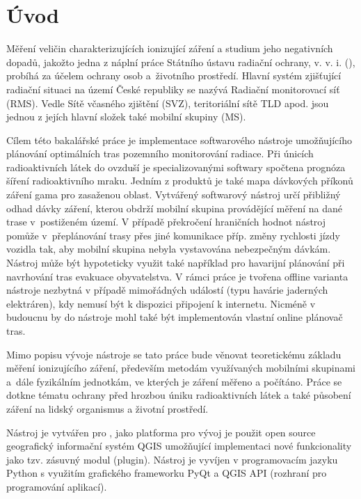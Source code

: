 \chapter{Úvod}
\label{1-uvod}
Měření veličin charakterizujících ionizující záření a studium jeho negativních dopadů, jakožto jedna z náplní práce Státního ústavu radiační ochrany, v. v. i. (), probíhá za účelem ochrany osob a~životního prostředí. %
Hlavní systém zjišťující radiační situaci na území České republiky se nazývá Radiační monitorovací síť (RMS). Vedle Sítě včasného zjištění (SVZ), teritoriální sítě TLD apod. jsou jednou z jejích hlavní složek také mobilní skupiny (MS).

Cílem této bakalářské práce je implementace softwarového nástroje umožňujícího plánování optimálních tras pozemního monitorování radiace. Při únicích radioaktivních látek do ovzduší je specializovanými softwary spočtena prognóza šíření radioaktivního mraku. Jedním z produktů je také mapa dávkových příkonů záření gama pro zasaženou oblast. Vytvářený softwarový nástroj určí přibližný odhad dávky záření, kterou obdrží mobilní skupina provádějící měření na dané trase v~postiženém území. V případě překročení hraničních hodnot nástroj pomůže v~přeplánování trasy přes jiné komunikace příp. změny rychlosti jízdy vozidla tak, aby mobilní skupina nebyla vystavována nebezpečným dávkám. 
Nástroj může být hypoteticky využit také například pro havarijní plánování při navrhování tras evakuace obyvatelstva. V rámci práce je tvořena offline varianta nástroje nezbytná v případě mimořádných událostí (typu havárie jaderných elektráren), kdy nemusí být k dispozici připojení k internetu. Nicméně v budoucnu by do nástroje mohl také být implementován vlastní online plánovač tras. 

Mimo popisu vývoje nástroje se tato práce bude věnovat teoretickému základu měření ionizujícího záření, především metodám využívaných mobilními skupinami a~dále fyzikálním jednotkám, ve kterých je záření měřeno a počítáno. Práce se  dotkne tématu ochrany před hrozbou úniku radioaktivních látek a také působení záření na lidský organismus a životní prostředí.

Nástroj je vytvářen pro , jako platforma pro vývoj je použit open source geografický informační systém QGIS umožňující implementaci nové funkcionality jako tzv. zásuvný modul (plugin). Nástroj je vyvíjen v programovacím jazyku Python s využitím grafického frameworku PyQt a QGIS API (rozhraní pro programování aplikací).    






